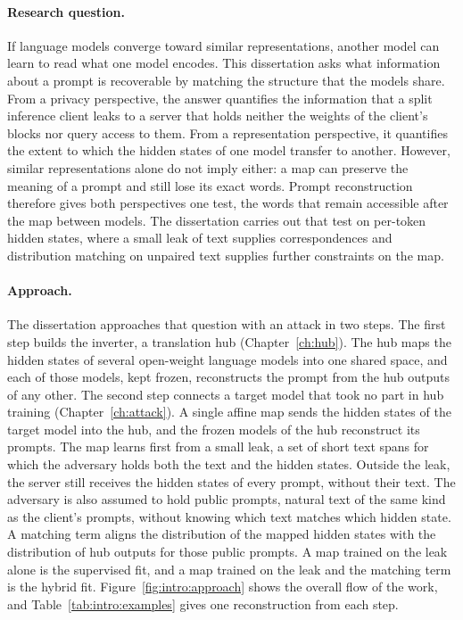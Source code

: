 \paragraph{Research question.} If language models converge toward similar representations, another model can learn to read what one model encodes.
This dissertation asks what information about a prompt is recoverable by matching the structure that the models share.
From a privacy perspective, the answer quantifies the information that a split inference client leaks to a server that holds neither the weights of the client's blocks nor query access to them.
From a representation perspective, it quantifies the extent to which the hidden states of one model transfer to another.
However, similar representations alone do not imply either: a map can preserve the meaning of a prompt and still lose its exact words.
Prompt reconstruction therefore gives both perspectives one test, the words that remain accessible after the map between models.
The dissertation carries out that test on per-token hidden states, where a small leak of text supplies correspondences and distribution matching on unpaired text supplies further constraints on the map.

\paragraph{Approach.} The dissertation approaches that question with an attack in two steps.
The first step builds the inverter, a translation hub (Chapter~\ref{ch:hub}).
The hub maps the hidden states of several open-weight language models into one shared space, and each of those models, kept frozen, reconstructs the prompt from the hub outputs of any other.
The second step connects a target model that took no part in hub training (Chapter~\ref{ch:attack}).
A single affine map sends the hidden states of the target model into the hub, and the frozen models of the hub reconstruct its prompts.
The map learns first from a small leak, a set of short text spans for which the adversary holds both the text and the hidden states.
Outside the leak, the server still receives the hidden states of every prompt, without their text.
The adversary is also assumed to hold public prompts, natural text of the same kind as the client's prompts, without knowing which text matches which hidden state.
A matching term aligns the distribution of the mapped hidden states with the distribution of hub outputs for those public prompts.
A map trained on the leak alone is the supervised fit, and a map trained on the leak and the matching term is the hybrid fit.
Figure~\ref{fig:intro:approach} shows the overall flow of the work, and Table~\ref{tab:intro:examples} gives one reconstruction from each step.

